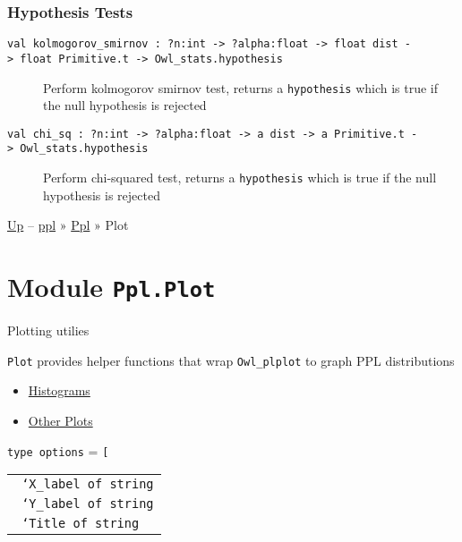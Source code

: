 \hypertarget{hypux5ftests}{\subsubsection{\texorpdfstring{\protect\hyperlink{hypux5ftests}{}Hypothesis
Tests}{Hypothesis Tests}}\label{hypux5ftests}}

\begin{description}
\item[{\protect\hyperlink{val-kolmogorovux5fsmirnov}{}\texttt{val\ kolmogorov\_smirnov\ :\ ?⁠n:int\ -\textgreater{}\ ?⁠alpha:float\ -\textgreater{}\ float\ dist\ -\textgreater{}\ float\ Primitive.t\ -\textgreater{}\ Owl\_stats.hypothesis}}]
Perform kolmogorov smirnov test, returns a \texttt{hypothesis} which is
true if the null hypothesis is rejected
\end{description}

\begin{description}
\item[{\protect\hyperlink{val-chiux5fsq}{}\texttt{val\ chi\_sq\ :\ ?⁠n:int\ -\textgreater{}\ ?⁠alpha:float\ -\textgreater{}\ \textquotesingle{}a\ dist\ -\textgreater{}\ \textquotesingle{}a\ Primitive.t\ -\textgreater{}\ Owl\_stats.hypothesis}}]
Perform chi-squared test, returns a \texttt{hypothesis} which is true if
the null hypothesis is rejected
\end{description}

\href{../index.html}{Up} -- \href{../../index.html}{ppl} »
\href{../index.html}{Ppl} » Plot

\section{\texorpdfstring{Module
\texttt{Ppl.Plot}}{Module Ppl.Plot}}\label{module-ppl.plot}

Plotting utilies

\texttt{Plot} provides helper functions that wrap \texttt{Owl\_plplot}
to graph PPL distributions

\begin{itemize}
\tightlist
\item
  \protect\hyperlink{histograms}{Histograms}
\item
  \protect\hyperlink{otherux5fplots}{Other Plots}
\end{itemize}

\protect\hyperlink{type-options}{}\texttt{type\ options} =
\texttt{{[}\ }

\begin{longtable}[c]{@{}l@{}}
\toprule
\protect\hyperlink{type-options.Xux5flabel}{}\texttt{\textbar{}\ }\texttt{`X\_label\ of\ string}\tabularnewline
\protect\hyperlink{type-options.Yux5flabel}{}\texttt{\textbar{}\ }\texttt{`Y\_label\ of\ string}\tabularnewline
\protect\hyperlink{type-options.Title}{}\texttt{\textbar{}\ }\texttt{`Title\ of\ string}\tabularnewline
\bottomrule
\end{longtable}

